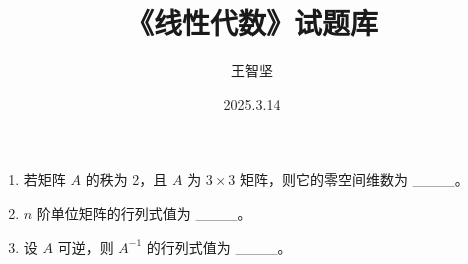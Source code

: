 \documentclass[12pt]{ctexart}
\title{《线性代数》试题库}
\author{王智坚}
\date{2025.3.14}
\begin{document}
\begin{enumerate}
	\item 若矩阵 $A$ 的秩为 2，且 $A$ 为 $3 \times 3$ 矩阵，则它的零空间维数为 \_\_\_\_。
	\item $n$ 阶单位矩阵的行列式值为 \_\_\_\_。
	\item 设 $A$ 可逆，则 $A^{-1}$ 的行列式值为 \_\_\_\_。
\end{enumerate}
\end{document}

